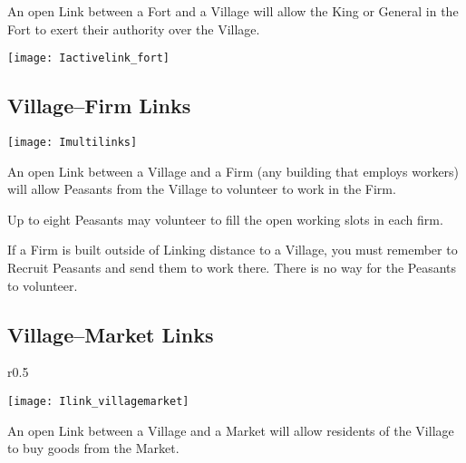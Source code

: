 
An open Link between a Fort and a Village will allow the King or General in the Fort to exert their authority over the Village.

	\begin{center}
		\texttt{[image: Iactivelink\_fort]}
	\end{center}

\clearpage

\subsection{Village–Firm Links}

\begin{center}
	\texttt{[image: Imultilinks]}
\end{center}

An open Link between a Village and a Firm (any building that employs workers) will allow Peasants from the Village to volunteer to work in the Firm.

Up to eight Peasants may volunteer to fill the open working slots in each firm.

If a Firm is built outside of Linking distance to a Village, you must remember to Recruit Peasants and send them to work there. There is no way for the Peasants to volunteer.

\subsection{Village–Market Links}

\begin{wrapfigure}{r}{0.5\textwidth}
	\vspace{-20pt}
	\begin{center}
		\texttt{[image: Ilink\_villagemarket]}
	\end{center}
	\vspace{-20pt}
	\vspace{-10pt}
\end{wrapfigure}

An open Link between a Village and a Market will allow residents of the Village to buy goods from the Market.

